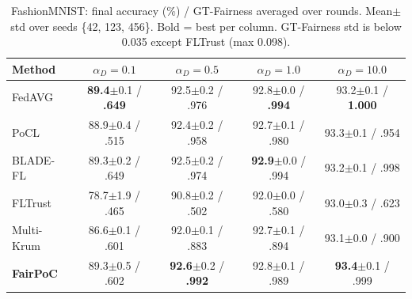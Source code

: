 \documentclass[conference]{IEEEtran}
\theoremstyle{remark}
\begin{document}
\begin{table}[t]
\caption{FashionMNIST: final accuracy (\%) / GT-Fairness averaged over rounds. Mean$\pm$std over seeds \{42, 123, 456\}. Bold = best per column. GT-Fairness std is below 0.035 except FLTrust (max 0.098).}
\label{tab:fashionmnist}
\centering
\renewcommand{\arraystretch}{1.1}
\setlength{\tabcolsep}{2.5pt}
\scriptsize
\begin{tabular}{lcccc}
\toprule
\textbf{Method} & $\alpha_D{=}0.1$ & $\alpha_D{=}0.5$ & $\alpha_D{=}1.0$ & $\alpha_D{=}10.0$ \\
\midrule
FedAVG             & \textbf{89.4}$\pm$0.1 / \textbf{.649} & 92.5$\pm$0.2 / .976 & 92.8$\pm$0.0 / \textbf{.994} & 93.2$\pm$0.1 / \textbf{1.000} \\
PoCL               & 88.9$\pm$0.4 / .515 & 92.4$\pm$0.2 / .958 & 92.7$\pm$0.1 / .980 & 93.3$\pm$0.1 / .954 \\
BLADE-FL           & 89.3$\pm$0.2 / .649 & 92.5$\pm$0.2 / .974 & \textbf{92.9}$\pm$0.0 / .994 & 93.2$\pm$0.1 / .998 \\
FLTrust            & 78.7$\pm$1.9 / .465 & 90.8$\pm$0.2 / .502 & 92.0$\pm$0.0 / .580 & 93.0$\pm$0.3 / .623 \\
Multi-Krum         & 86.6$\pm$0.1 / .601 & 92.0$\pm$0.1 / .883 & 92.7$\pm$0.1 / .894 & 93.1$\pm$0.0 / .900 \\
\textbf{FairPoC}   & 89.3$\pm$0.5 / .602 & \textbf{92.6}$\pm$0.2 / \textbf{.992} & 92.8$\pm$0.1 / .989 & \textbf{93.4}$\pm$0.1 / .999 \\
\bottomrule
\end{tabular}
\end{table}
\end{document}
